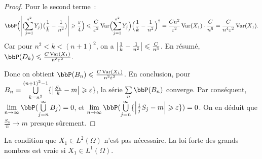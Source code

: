 \begin{proof}
    Pour le second terme~:
    \[ \bbP\Bigl(\lrvert{\bigl(\sum_{j = 1}^{n^2} Y_j\bigr)\bigl(\frac{1}{k} - \frac{1}{n^2}\bigr)} \geqslant \frac{\varepsilon}{4}\Bigr)
        \leqslant \frac{C}{\varepsilon^2} \var\Bigl(\sum_{j = 1}^{n^2} Y_j\Bigr) \Bigl(\frac{1}{k} - \frac{1}{n^2}\Bigr)^2
        = \frac{Cn^2}{\varepsilon^2} \var(X_1) \cdot \frac{C}{n^6}
        = \frac{C}{n^4 \varepsilon^2} \var(X_1). \]
    Car pour $n^2 < k < (n+1)^2$, on a $\left\lvert \frac{1}{k} - \frac{1}{n^2} \right\rvert \leqslant \frac{C}{n^3}$.
    En résumé, $\bbP(D_k) \leqslant \frac{C \var(X_1)}{n^3 \varepsilon^2}$.

    Donc on obtient $\bbP(B_n) \leqslant \frac{C \var(X_1)}{n^2 \varepsilon^2}$.
    En conclusion, pour $B_n = \bigcup\limits_{k = n^2}^{(n + 1)^2 - 1} \{ \left\lvert \frac{S_k}{k} - m \right\rvert
        \geqslant \varepsilon \}$, la série $\sum\limits_{n} \bbP(B_n)$ converge.
    Par conséquent, $\lim\limits_{n \to \infty} \bbP(\bigcup\limits_{j = n}^\infty B_j) = 0$,
    et $\lim\limits_{n \to \infty} \bbP(\bigcup\limits_{j = n}^\infty \{ \lrvert{\frac{1}{j} S_j - m}
        \geqslant \varepsilon \}) = 0$.
    On en déduit que $\frac{S_n}{n} \to m$ presque sûrement.
\end{proof}

\begin{rqq}
    La condition que $X_1 \in L^2(\Omega)$ n'est pas nécessaire.
    La loi forte des grands nombres est vraie si $X_1 \in L^1(\Omega)$.
\end{rqq}
